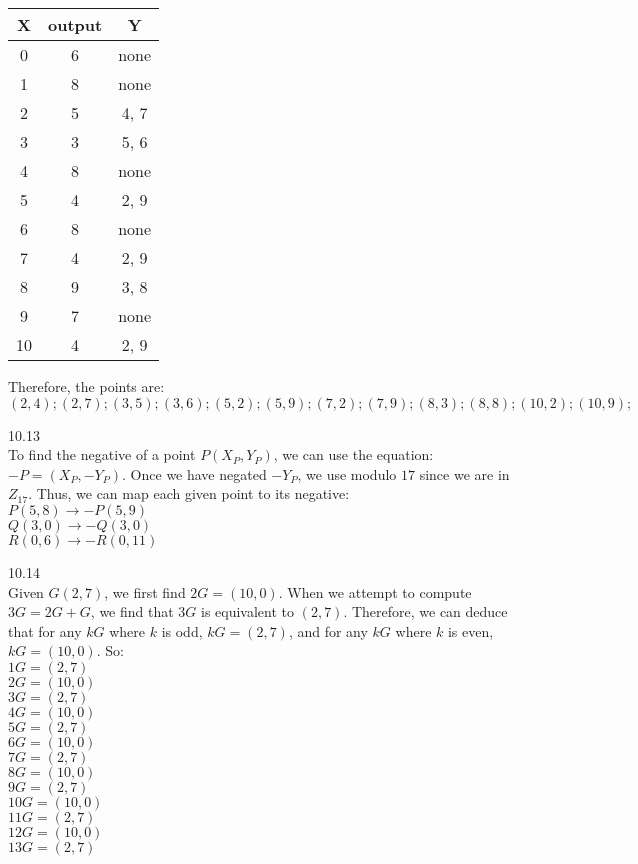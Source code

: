 \documentclass[11pt]{article}
\newcommand{\gap}{\vspace{3mm}}
\begin{document}
\begin{center}
\begin{tabular}{ |c|c|c| } 
 \hline
 X & output & Y\\ 
 \hline
 0 & 6 & none\\ 
 1 & 8 & none \\ 
 2 & 5 & 4, 7 \\ 
 3 & 3 & 5, 6 \\ 
 4 & 8 & none \\ 
 5 & 4 & 2, 9 \\ 
 6 & 8 & none \\ 
 7 & 4 & 2, 9 \\ 
 8 & 9 & 3, 8 \\ 
 9 & 7 & none \\ 
 10 & 4 & 2, 9 \\ 
 \hline
\end{tabular}
\end{center}

Therefore, the points are: $(2,4); (2,7); (3,5); (3,6); (5,2); (5,9); (7,2); (7,9); (8,3); (8,8); (10,2); (10,9);$

\gap{}

10.13\\

To find the negative of a point $P(X_P, Y_P)$, we can use the equation: $-P = (X_P, -Y_P)$. Once we have negated $-Y_P$, we use modulo $17$ since we are in $Z_17$. Thus, we can map each given point to its negative:\\
$P(5,8) \rightarrow -P(5,9)$\\
$Q(3,0) \rightarrow -Q(3,0)$\\
$R(0,6) \rightarrow -R(0,11)$\\

\gap{}

10.14\\

Given $G(2,7)$, we first find $2G=(10, 0)$. When we attempt to compute $3G=2G+G$, we find that $3G$ is equivalent to $(2,7)$. Therefore, we can deduce that for any $kG$ where $k$ is odd, $kG=(2,7)$, and for any $kG$ where $k$ is even, $kG=(10,0)$. So:\\
$1G=(2,7)$\\
$2G=(10,0)$\\
$3G=(2,7)$\\
$4G=(10,0)$\\
$5G=(2,7)$\\
$6G=(10,0)$\\
$7G=(2,7)$\\
$8G=(10,0)$\\
$9G=(2,7)$\\
$10G=(10,0)$\\
$11G=(2,7)$\\
$12G=(10,0)$\\
$13G=(2,7)$\\
\end{document}
